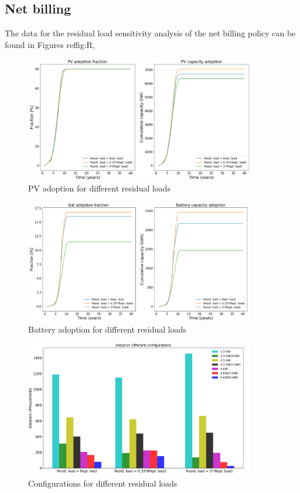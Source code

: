 \subsection{Net billing}
The data for the residual load sensitivity analysis of the net billing policy can be found in Figures ref{fig:R}, %
\newline 
\begin{figure}[h!]
    \centering
    \includegraphics[width=10cm]{AppendixA/PVNBresid.PNG}
    \caption{PV adoption for different residual loads}
    \label{fig:Q}
\end{figure}
\noindent
\newline 
\begin{figure}[h!]
    \centering
    \includegraphics[width=10cm]{AppendixA/BatNBresid.PNG}
    \caption{Battery adoption for different residual loads}
    \label{fig:R}
\end{figure}
\noindent
\newline 
\begin{figure}[h!]
    \centering
    \includegraphics[width=10cm]{AppendixA/ConfigNBresid.PNG}
    \caption{Configurations for different residual loads}
    \label{fig:S}
\end{figure}
